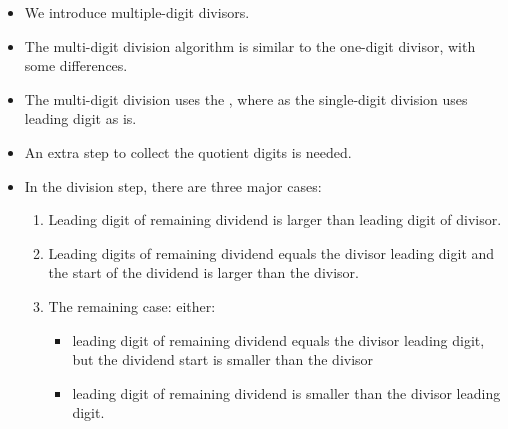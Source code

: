 \begin{frame}
\begin{itemize}
\item We introduce multiple-digit divisors. 
\item The multi-digit division algorithm is similar to the one-digit divisor, with some differences.
\item The multi-digit division uses the , where as the single-digit division uses leading digit as is.
\item An extra step to collect the quotient digits is needed.
\item In the division step, there are three major cases:
\begin{enumerate}
\item Leading digit of remaining dividend is larger than leading digit of divisor.
\item Leading digits of remaining dividend equals the divisor leading digit and the start of the dividend is larger than the divisor.
\item The remaining case: either: 
\begin{itemize}
\item leading digit of remaining dividend equals the divisor leading digit, but the dividend start is smaller than the divisor 
\item leading digit of remaining dividend is smaller than the divisor leading digit.
\end{itemize}
\end{enumerate}
\end{itemize}
\end{frame}